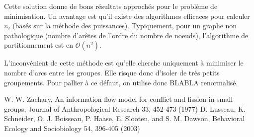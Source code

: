 \documentclass[12pt]{article}
\begin{document}
Cette solution donne de bons résultats approchés pour le problème de
minimisation. Un avantage est qu'il existe des algorithmes efficaces
pour calculer $v_2$ (basés sur la méthode des
puissances). Typiquement, pour un graphe non pathologique (nombre
d'arêtes de l'ordre du nombre de noeuds), l'algorithme de
partitionnement est en $\mathcal O(n^2)$.

L'inconvénient de cette méthode est qu'elle cherche uniquement à
minimiser le nombre d'arcs entre les groupes. Elle risque donc
d'isoler de très petits groupements. Pour pallier à ce défaut, on
utilise donc BLABLA renormalisé.

\clearpage
\begin{thebibliography}{2}
 W. W. Zachary, An information flow model for conflict and fission in small groups, Journal of Anthropological Research 33, 452-473 (1977)
 D. Lusseau, K. Schneider, O. J. Boisseau, P. Haase, E. Slooten, and S. M. Dawson, Behavioral Ecology and Sociobiology 54, 396-405 (2003)
\end{thebibliography}
\end{document}
